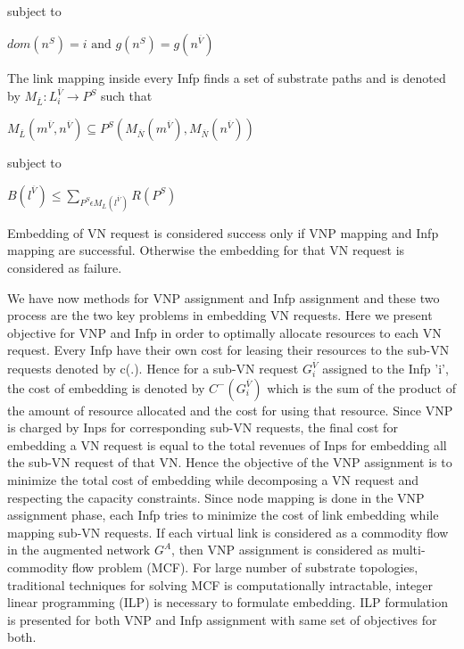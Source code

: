 \documentclass[article,dr=phil,type=msc ,colorback,accentcolor=tud4b]{tudthesis}
\begin{document}
\begin{enumerate}[label=(\Alph*)]
\hspace*{4cm}subject to 

\hspace*{6cm}$dom(n^{S}) = i \text{ and } g(n^{S}) = g(n^{\overline{V}})$  \newline

The link mapping inside every Infp finds a set of substrate paths and is denoted by $M_{\overline{L}} : L_{i}^{\overline{V}} \rightarrow P^{S}$ such that

\hspace*{5cm} $M_{\overline{L}}(m^{\overline{V}}, n^{\overline{V}}) \subseteq P^{S}(M_{\overline{N}}(m^{\overline{V}}), M_{\overline{N}}(n^{\overline{V}}))$ \newline

\hspace*{4cm} subject to

\hspace*{5cm} $B(l^{\overline{V}}) \leq \sum_{P^{S}\epsilon M_{\overline{L}}(l^{\overline{V}})} R(P^{S})$ \newline

Embedding of VN request is considered success only if VNP mapping and Infp mapping are successful. Otherwise the embedding for that VN request is considered as failure.
\end{enumerate}

We have now methods for VNP assignment and Infp assignment and these two process are the two key problems in embedding VN requests. Here we present objective for VNP and Infp in order to optimally allocate resources to each VN request. Every Infp have their own cost for leasing their resources to the sub-VN requests denoted by c(.). Hence for a sub-VN request $G^{\overline{V}}_{i}$ assigned to the Infp 'i', the cost of embedding is denoted by $C^{-}(G^{\overline{V}}_{i})$ which is the sum of the product of the amount of resource allocated and the cost for using that resource. Since VNP is charged by Inps for corresponding sub-VN requests, the final cost for embedding a VN request is equal to the total revenues of Inps for embedding all the sub-VN request of that VN. Hence the objective of the VNP assignment is to minimize the total cost of embedding while decomposing a VN request and respecting the capacity constraints. Since node mapping is done in the VNP assignment phase, each Infp tries to minimize the cost of link embedding while mapping sub-VN requests. If each virtual link is considered as a commodity flow in the augmented network $G^{A}$, then VNP assignment is considered as multi-commodity flow problem (MCF). For large number of substrate topologies, traditional techniques for solving MCF is computationally intractable, integer linear programming (ILP) is necessary to formulate embedding. ILP formulation is presented for both VNP and Infp assignment with same set of objectives for both. \newline
\end{document}
